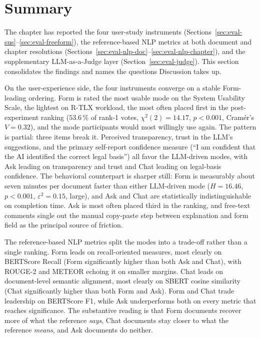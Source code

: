 \clearpage
\section{Summary}
\label{sec:eval-summary}

The chapter has reported the four user-study instruments
(Sections~\ref{sec:eval-sus}--\ref{sec:eval-freeform}), the
reference-based NLP metrics at both document and chapter
resolutions
(Sections~\ref{sec:eval-nlp-doc}--\ref{sec:eval-nlp-chapter}), and
the supplementary LLM-as-a-Judge layer
(Section~\ref{sec:eval-judge}). This section consolidates the
findings and names the questions Discussion takes up.

On the user-experience side, the four instruments converge on a
stable Form-leading ordering. Form is rated the most usable mode
on the System Usability Scale, the lightest on R-TLX workload,
the most often placed first in the post-experiment ranking
($53.6\,\%$ of rank-1 votes, $\chi^2(2) = 14.17$, $p < 0.001$,
Cram\'{e}r's $V = 0.32$), and the mode participants would most
willingly use again. The pattern is partial: three items break
it. Perceived transparency, trust in the LLM's suggestions, and
the primary self-report confidence measure (``I am confident that
the AI identified the correct legal basis'') all favor the
LLM-driven modes, with Ask leading on transparency and trust and
Chat leading on legal-basis confidence. The behavioral
counterpart is sharper still: Form is measurably about seven
minutes per document faster than either LLM-driven mode
($H = 16.46$, $p < 0.001$, $\varepsilon^2 = 0.15$, large), and Ask
and Chat are statistically indistinguishable on completion time.
Ask is most often placed third in the ranking, and free-text
comments single out the manual copy-paste step between
explanation and form field as the principal source of friction.

The reference-based NLP metrics split the modes into a trade-off
rather than a single ranking. Form leads on recall-oriented
measures, most clearly on BERTScore Recall (Form significantly
higher than both Ask and Chat), with ROUGE-2 and METEOR echoing
it on smaller margins. Chat leads on document-level semantic
alignment, most clearly on SBERT cosine similarity (Chat
significantly higher than both Form and Ask). Form and Chat
trade leadership on BERTScore F1, while Ask underperforms both on
every metric that reaches significance.
The substantive reading is that Form documents recover more of
what the reference \emph{says}, Chat documents stay closer to
what the reference \emph{means}, and Ask documents do neither.

